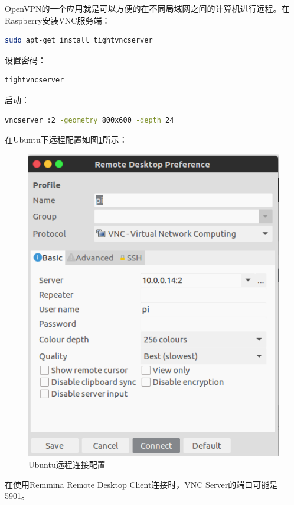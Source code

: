 \documentclass[12pt]{book}
\numberwithin{dummy}{section}
\theoremstyle{ocrenumbox}
\theoremstyle{blacknumex}
\theoremstyle{blacknumbox}
\theoremstyle{ocrenum}
\begin{document}
OpenVPN的一个应用就是可以方便的在不同局域网之间的计算机进行远程。在Raspberry安装VNC服务端：

\begin{lstlisting}[language=Bash]
sudo apt-get install tightvncserver
\end{lstlisting}

设置密码：

\begin{lstlisting}[language=Bash]
tightvncserver
\end{lstlisting}

启动：

\begin{lstlisting}[language=Bash]
vncserver :2 -geometry 800x600 -depth 24
\end{lstlisting}

在Ubuntu下远程配置如图\ref{fig:raspberryremtoeconfig}所示：

\begin{figure}[htbp]
	\centering
	\includegraphics[scale=0.4]{raspberryremtoeconfig.png}
	\caption{Ubuntu远程连接配置}
	\label{fig:raspberryremtoeconfig}
\end{figure}

在使用Remmina Remote Desktop Client连接时，VNC Server的端口可能是5901。
\end{document}
